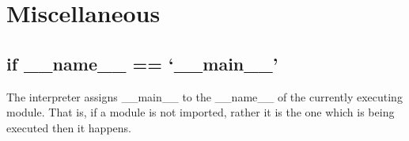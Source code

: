 \documentclass[a4paper, 12pt]{article}
\begin{document}
\section{Miscellaneous}
\subsection{if \_\_name\_\_ == `\_\_main\_\_'}
The interpreter assigns \_\_main\_\_ to the \_\_name\_\_ of the currently executing module. That is, if a module is not imported, rather it is the one which is being executed then it happens.
\end{document}
